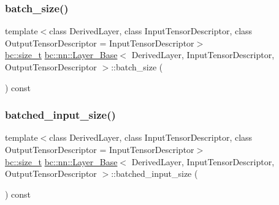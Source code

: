 \subsubsection{\texorpdfstring{batch\+\_\+size()}{batch\_size()}}
{\footnotesize\ttfamily template$<$class Derived\+Layer, class Input\+Tensor\+Descriptor, class Output\+Tensor\+Descriptor = Input\+Tensor\+Descriptor$>$ \\
\hyperlink{namespacebc_aaf8e3fbf99b04b1b57c4f80c6f55d3c5}{bc\+::size\+\_\+t} \hyperlink{structbc_1_1nn_1_1Layer__Base}{bc\+::nn\+::\+Layer\+\_\+\+Base}$<$ Derived\+Layer, Input\+Tensor\+Descriptor, Output\+Tensor\+Descriptor $>$\+::batch\+\_\+size (\begin{DoxyParamCaption}{ }\end{DoxyParamCaption}) const\hspace{0.3cm}{\ttfamily [inline]}}

\mbox{\label{structbc_1_1nn_1_1Layer__Base_a8beff5b62d525ca28e67d0c852e8a341}} 
\subsubsection{\texorpdfstring{batched\+\_\+input\+\_\+size()}{batched\_input\_size()}}
{\footnotesize\ttfamily template$<$class Derived\+Layer, class Input\+Tensor\+Descriptor, class Output\+Tensor\+Descriptor = Input\+Tensor\+Descriptor$>$ \\
\hyperlink{namespacebc_aaf8e3fbf99b04b1b57c4f80c6f55d3c5}{bc\+::size\+\_\+t} \hyperlink{structbc_1_1nn_1_1Layer__Base}{bc\+::nn\+::\+Layer\+\_\+\+Base}$<$ Derived\+Layer, Input\+Tensor\+Descriptor, Output\+Tensor\+Descriptor $>$\+::batched\+\_\+input\+\_\+size (\begin{DoxyParamCaption}{ }\end{DoxyParamCaption}) const\hspace{0.3cm}{\ttfamily [inline]}}

\mbox{\label{structbc_1_1nn_1_1Layer__Base_ac4e28faccc21e1d9510821bcde89ed42}} 
